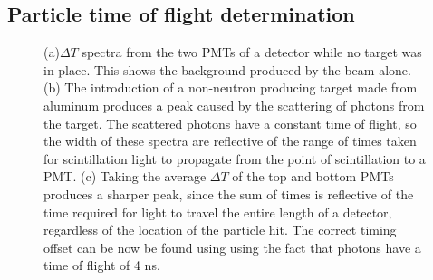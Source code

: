 \subsection{Particle time of flight determination}
\label{reconstruction}
\begin{figure}[htbp]
\begin{center}
\end{center}

\caption{(a)$\Delta T$ spectra from the two PMTs of a detector while no target was in place.
This shows the background produced by the beam alone.
(b) The introduction of a non-neutron producing target made from aluminum produces a peak caused by the scattering of photons from the target.
The scattered photons have a constant time of flight, so the width of these spectra are reflective of the range of times taken for scintillation light to propagate from the point of scintillation to a PMT.
(c) Taking the average $\Delta T$ of the top and bottom PMTs produces a sharper peak, since the sum of times is reflective of the time required for light to travel the entire length of a detector, regardless of the location of the particle hit.
The correct timing offset can be now be found using using the fact that photons have a time of flight of 4 ns. }
\label{fig:ToFDetermination}
\end{figure}

